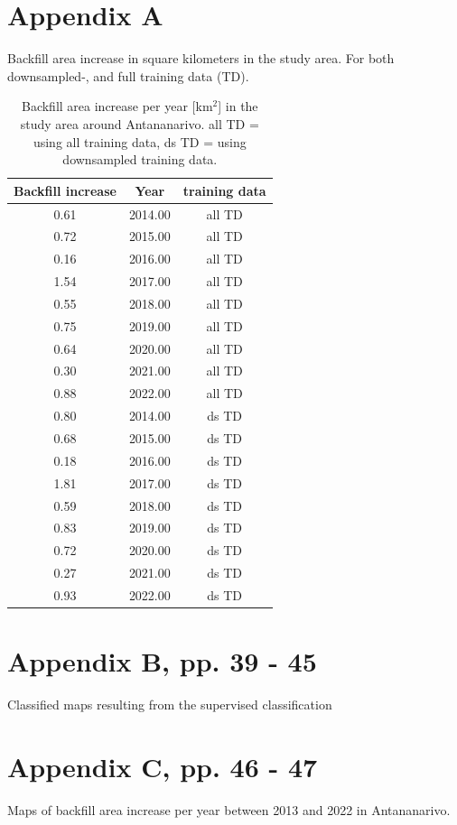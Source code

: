 \section*{Appendix A}
Backfill  area increase in square kilometers in the study area. For both downsampled-, and full training data (TD).
\begin{table}[ht]
\centering
\caption{Backfill area increase per year [km$^2$] in the study area around Antananarivo. all TD = using all training data, ds TD = using downsampled training data.} 
\begin{tabular}{ccc}
  \hline
Backfill increase & Year & training data \\ 
  \hline
0.61 & 2014.00 & all TD \\ 
  0.72 & 2015.00 & all TD \\ 
  0.16 & 2016.00 & all TD \\ 
  1.54 & 2017.00 & all TD \\ 
  0.55 & 2018.00 & all TD \\ 
  0.75 & 2019.00 & all TD \\ 
  0.64 & 2020.00 & all TD \\ 
  0.30 & 2021.00 & all TD \\ 
  0.88 & 2022.00 & all TD \\ 
  0.80 & 2014.00 & ds TD \\ 
  0.68 & 2015.00 & ds TD \\ 
  0.18 & 2016.00 & ds TD \\ 
  1.81 & 2017.00 & ds TD \\ 
  0.59 & 2018.00 & ds TD \\ 
  0.83 & 2019.00 & ds TD \\ 
  0.72 & 2020.00 & ds TD \\ 
  0.27 & 2021.00 & ds TD \\ 
  0.93 & 2022.00 & ds TD \\ 
   \hline
\end{tabular}

\end{table}

\section*{Appendix B, pp. 39 - 45}
Classified maps resulting from the supervised classification
\section*{Appendix C, pp. 46 - 47}
Maps of backfill area increase per year between 2013 and 2022 in Antananarivo.


